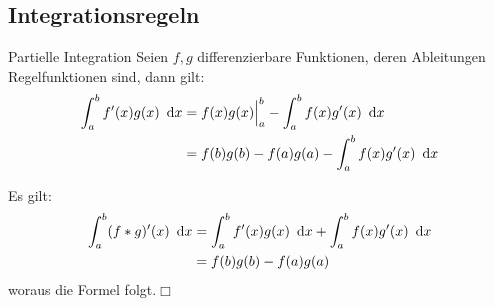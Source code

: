 \subsection{Integrationsregeln}
\begin{satz}{Partielle Integration}
	Seien $f,g$ differenzierbare Funktionen, deren Ableitungen Regelfunktionen sind, dann gilt:
	\begin{align*}
		\int_a^b f'(x)g(x)\ \operatorname{d}\! x
		&= f(x)g(x)\Big|_a^b-\int_a^b f(x)g'(x)\ \operatorname{d}\! x\\
		&= f(b)g(b)-f(a)g(a)-\int_a^b f(x)g'(x)\ \operatorname{d}\! x
	\end{align*}
\end{satz}
\begin{beweis}
	Es gilt:
	\begin{align*}
		\int_a^b (f*g)'(x)\ \operatorname{d}\! x
		&=\int_a^b f'(x)g(x)\ \operatorname{d}\! x+\int_a^b f(x)g'(x)\ \operatorname{d}\! x\\
		&=f(b)g(b)-f(a)g(a)
	\end{align*}
	woraus die Formel folgt.\hfill$\Box$
\end{beweis}

